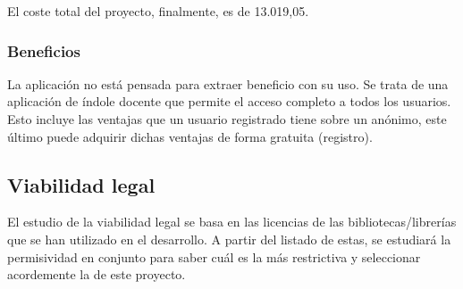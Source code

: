 El coste total del proyecto, finalmente, es de 13.019,05\texteuro.

\subsubsection{Beneficios}

La aplicación no está pensada para extraer beneficio con su uso. Se trata de una
aplicación de índole docente que permite el acceso completo a todos los
usuarios. Esto incluye las ventajas que un usuario registrado tiene sobre un
anónimo, este último puede adquirir dichas ventajas de forma gratuita
(registro).

\clearpage
\subsection{Viabilidad legal}

El estudio de la viabilidad legal se basa en las licencias de las
bibliotecas/librerías que se han utilizado en el desarrollo. A partir del
listado de estas, se estudiará la permisividad en conjunto para saber cuál es la
más restrictiva y seleccionar acordemente la de este proyecto.

